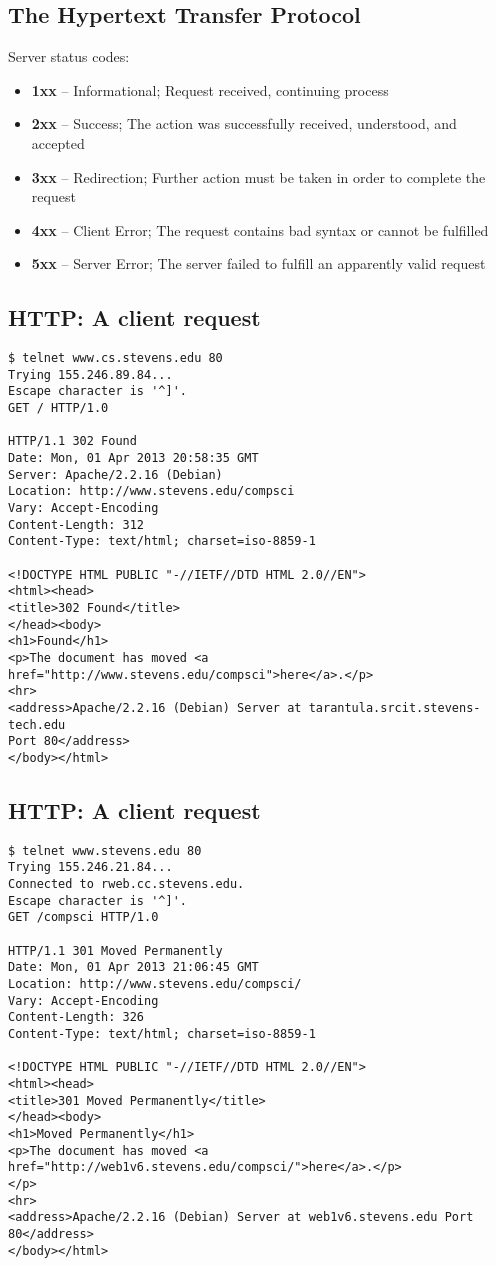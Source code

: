 \documentclass[xga]{xdvislides}
\begin{document}
\subsection{The Hypertext Transfer Protocol}
Server status codes:
\begin{itemize}
	\item {\bf 1xx} -- Informational; Request received, continuing process
	\item {\bf 2xx} -- Success; The action was successfully received,
        understood, and accepted
	\item {\bf 3xx} -- Redirection; Further action must be taken in order to
        complete the request
	\item {\bf 4xx} -- Client Error; The request contains bad syntax or
		cannot be fulfilled
	\item {\bf 5xx} -- Server Error; The server failed to fulfill an
		apparently valid request
\end{itemize}

\subsection{HTTP: A client request}
\smallish
\begin{verbatim}
$ telnet www.cs.stevens.edu 80
Trying 155.246.89.84...
Escape character is '^]'.
GET / HTTP/1.0

HTTP/1.1 302 Found
Date: Mon, 01 Apr 2013 20:58:35 GMT
Server: Apache/2.2.16 (Debian)
Location: http://www.stevens.edu/compsci
Vary: Accept-Encoding
Content-Length: 312
Content-Type: text/html; charset=iso-8859-1

<!DOCTYPE HTML PUBLIC "-//IETF//DTD HTML 2.0//EN">
<html><head>
<title>302 Found</title>
</head><body>
<h1>Found</h1>
<p>The document has moved <a
href="http://www.stevens.edu/compsci">here</a>.</p>
<hr>
<address>Apache/2.2.16 (Debian) Server at tarantula.srcit.stevens-tech.edu
Port 80</address>
</body></html>
\end{verbatim}
\Normalsize

\subsection{HTTP: A client request}
\smallish
\begin{verbatim}
$ telnet www.stevens.edu 80
Trying 155.246.21.84...
Connected to rweb.cc.stevens.edu.
Escape character is '^]'.
GET /compsci HTTP/1.0

HTTP/1.1 301 Moved Permanently
Date: Mon, 01 Apr 2013 21:06:45 GMT
Location: http://www.stevens.edu/compsci/
Vary: Accept-Encoding
Content-Length: 326
Content-Type: text/html; charset=iso-8859-1

<!DOCTYPE HTML PUBLIC "-//IETF//DTD HTML 2.0//EN">
<html><head>
<title>301 Moved Permanently</title>
</head><body>
<h1>Moved Permanently</h1>
<p>The document has moved <a
href="http://web1v6.stevens.edu/compsci/">here</a>.</p>
</p>
<hr>
<address>Apache/2.2.16 (Debian) Server at web1v6.stevens.edu Port 80</address>
</body></html>
\end{verbatim}
\Normalsize
\end{document}
